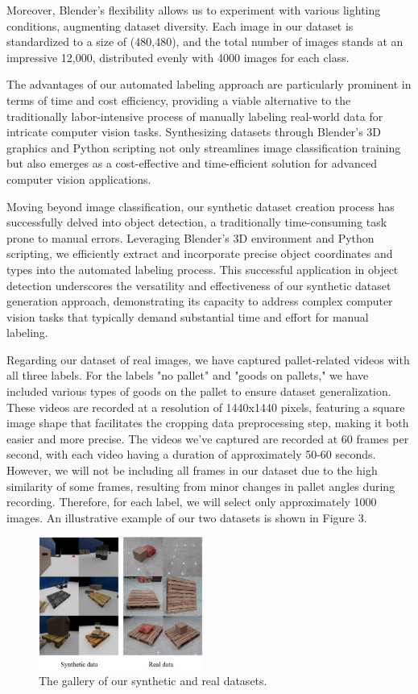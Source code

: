 \documentclass[nonacm, sigconf]{acmart}
\begin{document}
\noindent Moreover, Blender's flexibility allows us to experiment with various lighting conditions, augmenting dataset diversity. Each image in our dataset is standardized to a size of (480,480), and the total number of images stands at an impressive 12,000, distributed evenly with 4000 images for each class.

\noindent The advantages of our automated labeling approach are particularly prominent in terms of time and cost efficiency, providing a viable alternative to the traditionally labor-intensive process of manually labeling real-world data for intricate computer vision tasks. Synthesizing datasets through Blender's 3D graphics and Python scripting not only streamlines image classification training but also emerges as a cost-effective and time-efficient solution for advanced computer vision applications.

\noindent Moving beyond image classification, our synthetic dataset creation process has successfully delved into object detection, a traditionally time-consuming task prone to manual errors. Leveraging Blender's 3D environment and Python scripting, we efficiently extract and incorporate precise object coordinates and types into the automated labeling process. This successful application in object detection underscores the versatility and effectiveness of our synthetic dataset generation approach, demonstrating its capacity to address complex computer vision tasks that typically demand substantial time and effort for manual labeling.

\noindent Regarding our dataset of real images, we have captured pallet-related videos with all three labels. For the labels "no pallet" and "goods on pallets," we have included various types of goods on the pallet to ensure dataset generalization. These videos are recorded at a resolution of 1440x1440 pixels, featuring a square image shape that facilitates the cropping data preprocessing step, making it both easier and more precise. The videos we've captured are recorded at 60 frames per second, with each video having a duration of approximately 50-60 seconds. However, we will not be including all frames in our dataset due to the high similarity of some frames, resulting from minor changes in pallet angles during recording. Therefore, for each label, we will select only approximately 1000 images. An illustrative example of our two datasets is shown in Figure 3.


\begin{figure}[h]
  \centering
  \includegraphics[width=0.48\textwidth]{images/dataset.jpg}
  \caption{The gallery of our synthetic and real datasets.}
  \label{fig:your-image}
\end{figure}
\end{document}
